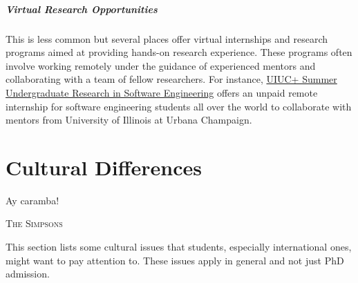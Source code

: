 \documentclass[oneside,11pt,dvipsnames]{book}
\begin{document}
\paragraph{Virtual Research Opportunities} This is less common but several places offer virtual internships and research programs aimed at providing hands-on research experience. These programs often involve working remotely under the guidance of experienced mentors and collaborating with a team of fellow researchers. For instance, \href{https://docs.google.com/forms/d/1btIwt4HwjyKMOUk-EMy3rbkfWzFxv2lNrMm_zkd0pA4/viewform?edit_requested=true}{UIUC+ Summer Undergraduate Research in Software Engineering}  offers an unpaid remote internship for software engineering students all over the world to collaborate with mentors from University of Illinois at Urbana Champaign.



\chapter{Cultural Differences}\label{sec:cultural}

\epigraph{\vspace{-0.2in} Ay caramba!}{\textsc{The Simpsons}}


This section lists some cultural issues that students, especially international ones, might want to pay attention to. These issues apply in general and not just PhD admission.

\end{document}
